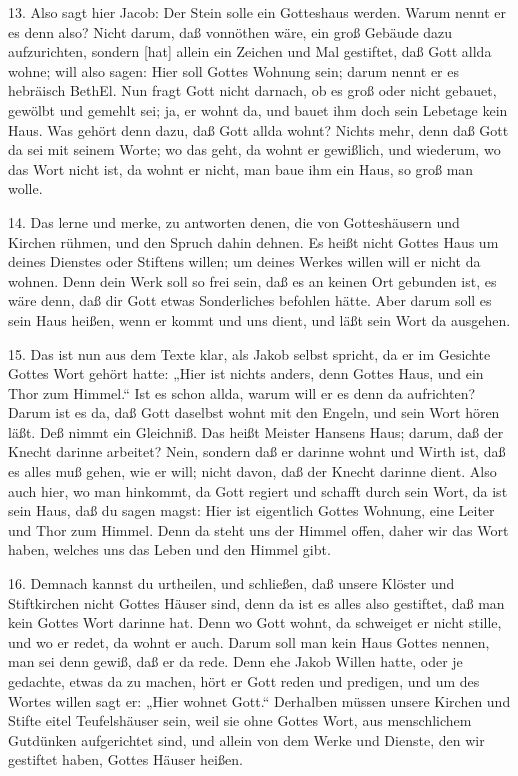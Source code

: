 13. Also sagt hier Jacob: Der Stein solle ein Gotteshaus werden. Warum nennt er es denn also? Nicht darum, daß vonnöthen wäre, ein groß Gebäude dazu aufzurichten, sondern [hat] allein ein Zeichen und Mal gestiftet, daß Gott allda wohne; will also sagen: Hier soll Gottes Wohnung sein; darum nennt er es hebräisch BethEl. Nun fragt Gott nicht darnach, ob es groß oder nicht gebauet, gewölbt und gemehlt sei; ja, er wohnt da, und bauet ihm doch sein Lebetage kein Haus. Was gehört denn dazu, daß Gott allda wohnt? Nichts mehr, denn daß Gott da sei mit seinem Worte; wo das geht, da wohnt er gewißlich, und wiederum, wo das Wort nicht ist, da wohnt er nicht, man baue ihm ein Haus, so groß man wolle.

14. Das lerne und merke, zu antworten denen, die von Gotteshäusern und Kirchen rühmen, und den Spruch dahin dehnen. Es heißt nicht Gottes Haus um deines Dienstes oder Stiftens willen; um deines Werkes willen will er nicht da wohnen. Denn dein Werk soll so frei sein, daß es an keinen Ort gebunden ist, es wäre denn, daß dir Gott etwas Sonderliches befohlen hätte. Aber darum soll es sein Haus heißen, wenn er kommt und uns dient, und läßt sein Wort da ausgehen.

15. Das ist nun aus dem Texte klar, als Jakob selbst spricht, da er im Gesichte Gottes Wort gehört hatte: „Hier ist nichts anders, denn Gottes Haus, und ein Thor zum Himmel.“ Ist es schon allda, warum will er es denn da aufrichten? Darum ist es da, daß Gott daselbst wohnt mit den Engeln, und sein Wort hören läßt. Deß nimmt ein Gleichniß. Das heißt Meister Hansens Haus; darum, daß der Knecht darinne arbeitet? Nein, sondern daß er darinne wohnt und Wirth ist, daß es alles muß gehen, wie er will; nicht davon, daß der Knecht darinne dient. Also auch hier, wo man hinkommt, da
Gott regiert und schafft durch sein Wort, da ist sein Haus, daß du sagen magst: Hier ist eigentlich Gottes Wohnung, eine Leiter und Thor zum Himmel. Denn da steht uns der Himmel offen, daher wir das Wort haben, welches uns das Leben und den Himmel gibt.

16. Demnach kannst du urtheilen, und schließen, daß unsere Klöster und Stiftkirchen nicht Gottes Häuser sind, denn da ist es alles also gestiftet, daß man kein Gottes Wort darinne hat. Denn wo Gott wohnt, da schweiget er nicht stille, und wo er redet, da wohnt er auch. Darum soll man kein Haus Gottes nennen, man sei denn gewiß, daß er da rede. Denn ehe Jakob Willen hatte, oder je gedachte, etwas da zu machen, hört er Gott reden und predigen, und um des Wortes willen sagt er: „Hier wohnet Gott.“ Derhalben müssen unsere Kirchen und Stifte eitel Teufelshäuser sein, weil sie ohne Gottes Wort, aus menschlichem Gutdünken aufgerichtet sind, und allein von dem Werke und Dienste, den wir gestiftet haben, Gottes Häuser heißen.

